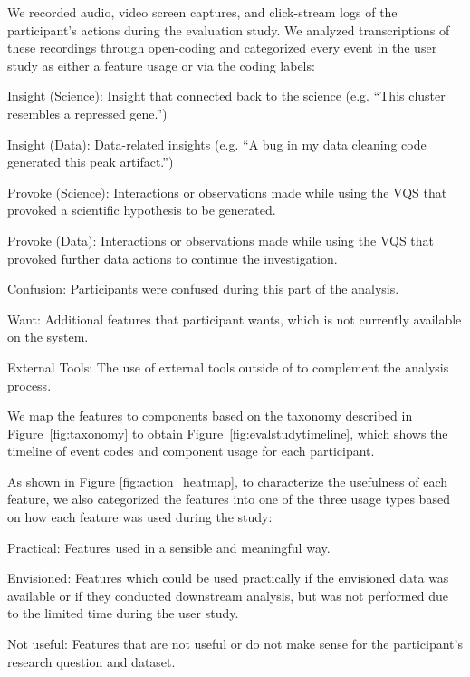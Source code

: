 We recorded audio, video screen captures, and click-stream logs of the participant's actions during the evaluation study. We analyzed transcriptions of these recordings through open-coding and categorized every event in the user study as either a feature usage or via the coding labels:
\begin{denselist}
    \item Insight (Science): Insight that connected back to the science (e.g. ``This cluster resembles a repressed gene.'')
    \item Insight (Data): Data-related insights (e.g. ``A bug in my data cleaning code generated this peak artifact.'')
    \item Provoke (Science): Interactions or observations made while using the VQS that provoked a scientific hypothesis to be generated.
    \item Provoke (Data): Interactions or observations made while using the VQS that provoked further data actions to continue the investigation.
    \item Confusion: Participants were confused during this part of the analysis.
    \item Want: Additional features that participant wants, which is not currently available on the system.
    \item External Tools: The use of external tools outside of \zv to complement the analysis process.
\end{denselist}
We map the features to components based on the taxonomy described in Figure~\ref{fig:taxonomy} to obtain Figure~\ref{fig:evalstudytimeline}, which shows the timeline of event codes and component usage for each participant.
\par As shown in Figure \ref{fig:action_heatmap}, to characterize the usefulness of each feature, we also categorized the features into one of the three usage types based on how each feature was used during the study:
\begin{denselist}
    \item Practical: Features used in a sensible and meaningful way.
    \item Envisioned: Features which could be used practically if the envisioned data was available or if they conducted downstream analysis, but was not performed due to the limited time during the user study.
    \item Not useful: Features that are not useful or do not make sense for the participant's research question and dataset.
\end{denselist}
